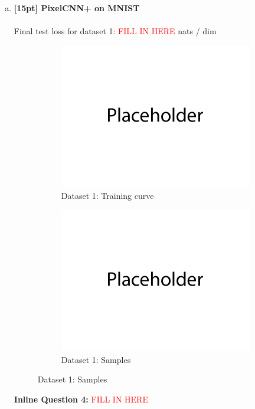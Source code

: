 \documentclass{article}
\begin{document}
\begin{enumerate}[(a)]
\newpage

\item {\bf [15pt] PixelCNN+ on MNIST} \\\\
Final test loss for dataset 1:  \textcolor{red}{FILL IN HERE}  nats / dim
\begin{figure}[H]
    \centering
    \begin{subfigure}{0.45\textwidth}
        \centering
        \includegraphics[width=\textwidth]{figures/placeholder.png}
        \caption{Dataset 1: Training curve}
    \end{subfigure}
    \hspace{0.2in}
    \begin{subfigure}{0.45\textwidth}
        \centering
        \includegraphics[width=\textwidth]{figures/placeholder.png}
        \caption{Dataset 1: Samples}
    \end{subfigure}
\end{figure}
\textbf{Inline Question 4:} \textcolor{red}{FILL IN HERE}



\end{enumerate}
\end{document}

